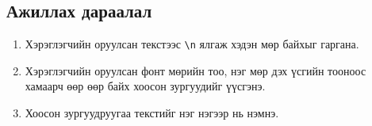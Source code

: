 \subsection{Ажиллах дараалал}
\begin{enumerate}
	\item Хэрэглэгчийн оруулсан текстээс \verb|\n| ялгаж хэдэн мөр байхыг гаргана.
	\item Хэрэглэгчийн оруулсан фонт мөрийн тоо, нэг мөр дэх үсгийн тооноос хамаарч өөр өөр байх хоосон зургуудийг үүсгэнэ.
	\item Хоосон зургуудруугаа текстийг нэг нэгээр нь нэмнэ.
	\end{enumerate}